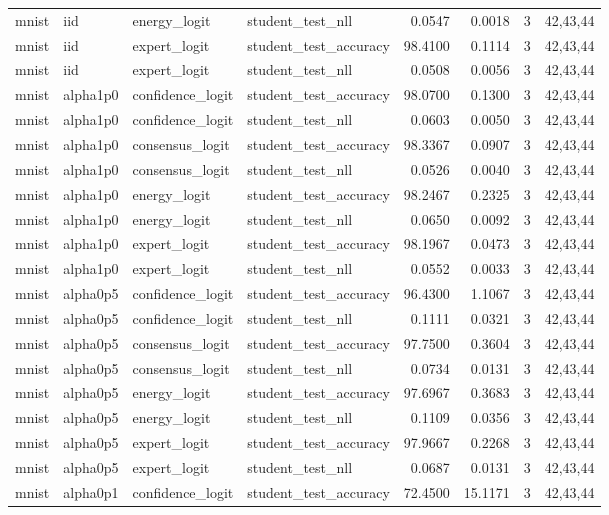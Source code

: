 \begin{tabular}{llllrrrl}
mnist & iid & energy\_logit & student\_test\_nll & 0.0547 & 0.0018 & 3 & 42,43,44 \\
mnist & iid & expert\_logit & student\_test\_accuracy & 98.4100 & 0.1114 & 3 & 42,43,44 \\
mnist & iid & expert\_logit & student\_test\_nll & 0.0508 & 0.0056 & 3 & 42,43,44 \\
mnist & alpha1p0 & confidence\_logit & student\_test\_accuracy & 98.0700 & 0.1300 & 3 & 42,43,44 \\
mnist & alpha1p0 & confidence\_logit & student\_test\_nll & 0.0603 & 0.0050 & 3 & 42,43,44 \\
mnist & alpha1p0 & consensus\_logit & student\_test\_accuracy & 98.3367 & 0.0907 & 3 & 42,43,44 \\
mnist & alpha1p0 & consensus\_logit & student\_test\_nll & 0.0526 & 0.0040 & 3 & 42,43,44 \\
mnist & alpha1p0 & energy\_logit & student\_test\_accuracy & 98.2467 & 0.2325 & 3 & 42,43,44 \\
mnist & alpha1p0 & energy\_logit & student\_test\_nll & 0.0650 & 0.0092 & 3 & 42,43,44 \\
mnist & alpha1p0 & expert\_logit & student\_test\_accuracy & 98.1967 & 0.0473 & 3 & 42,43,44 \\
mnist & alpha1p0 & expert\_logit & student\_test\_nll & 0.0552 & 0.0033 & 3 & 42,43,44 \\
mnist & alpha0p5 & confidence\_logit & student\_test\_accuracy & 96.4300 & 1.1067 & 3 & 42,43,44 \\
mnist & alpha0p5 & confidence\_logit & student\_test\_nll & 0.1111 & 0.0321 & 3 & 42,43,44 \\
mnist & alpha0p5 & consensus\_logit & student\_test\_accuracy & 97.7500 & 0.3604 & 3 & 42,43,44 \\
mnist & alpha0p5 & consensus\_logit & student\_test\_nll & 0.0734 & 0.0131 & 3 & 42,43,44 \\
mnist & alpha0p5 & energy\_logit & student\_test\_accuracy & 97.6967 & 0.3683 & 3 & 42,43,44 \\
mnist & alpha0p5 & energy\_logit & student\_test\_nll & 0.1109 & 0.0356 & 3 & 42,43,44 \\
mnist & alpha0p5 & expert\_logit & student\_test\_accuracy & 97.9667 & 0.2268 & 3 & 42,43,44 \\
mnist & alpha0p5 & expert\_logit & student\_test\_nll & 0.0687 & 0.0131 & 3 & 42,43,44 \\
mnist & alpha0p1 & confidence\_logit & student\_test\_accuracy & 72.4500 & 15.1171 & 3 & 42,43,44 \\

\end{tabular}
